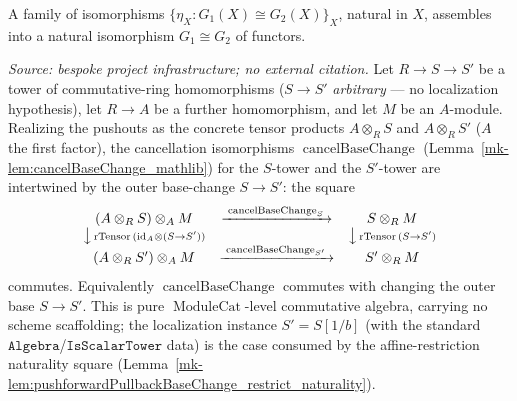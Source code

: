\begin{lemma}
  \label{mk-lem:natIso_ofComponents_mathlib}
  \mathlibok

  A family of isomorphisms \(\{\eta_X : G_1(X) \cong G_2(X)\}_X\), natural in \(X\),
  assembles into a natural isomorphism \(G_1 \cong G_2\) of functors.
\end{lemma}
\begin{lemma}\label{mk-lem:cancelBaseChange_localization_compat}
  \leanok

  \textit{Source: bespoke project infrastructure; no external citation.}
  Let \(R \to S \to S'\) be a tower of commutative-ring homomorphisms (\(S \to S'\)
  \emph{arbitrary} --- no localization hypothesis), let \(R \to A\) be a further homomorphism, and
  let \(M\) be an \(A\)-module. Realizing the pushouts as the concrete tensor products
  \(A \otimes_R S\) and \(A \otimes_R S'\) (\(A\) the first factor), the cancellation
  isomorphisms \(\operatorname{cancelBaseChange}\) (Lemma~\ref{mk-lem:cancelBaseChange_mathlib}) for the
  \(S\)-tower and the \(S'\)-tower are intertwined by the outer base-change \(S \to S'\): the square
  \[
    \begin{array}{ccc}
      (A \otimes_R S) \otimes_A M & \xrightarrow{\;\operatorname{cancelBaseChange}_S\;} & S \otimes_R M\\
      \big\downarrow{\scriptstyle\,\mathrm{rTensor}\,(\mathrm{id}_A \otimes (S\to S'))} & & \big\downarrow{\scriptstyle\,\mathrm{rTensor}\,(S \to S')}\\
      (A \otimes_R S') \otimes_A M & \xrightarrow{\;\operatorname{cancelBaseChange}_{S'}\;} & S' \otimes_R M
    \end{array}
  \]
  commutes. Equivalently \(\operatorname{cancelBaseChange}\) commutes with changing the outer base
  \(S \to S'\). This is pure \(\operatorname{ModuleCat}\)-level commutative algebra, carrying no
  scheme scaffolding; the localization instance \(S' = S[1/b]\) (with the standard
  \(\mathtt{Algebra}\)/\(\mathtt{IsScalarTower}\) data) is the case consumed by the
  affine-restriction naturality square
  (Lemma~\ref{mk-lem:pushforwardPullbackBaseChange_restrict_naturality}).
\end{lemma}

